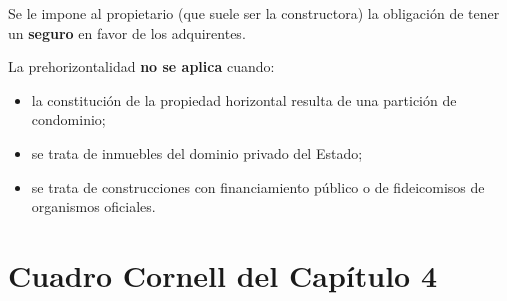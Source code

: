 \documentclass[12pt,oneside]{book}
\begin{document}
Se le impone al propietario (que suele ser la constructora) la obligación de tener un \textbf{seguro} en favor de los adquirentes.

La prehorizontalidad \textbf{no se aplica} cuando:

\begin{itemize}
    \item la constitución de la propiedad horizontal resulta de una partición de condominio;
    \item se trata de inmuebles del dominio privado del Estado;
    \item se trata de construcciones con financiamiento público o de fideicomisos de organismos oficiales.
\end{itemize}

\section{Cuadro Cornell del Capítulo 4}
\end{document}
